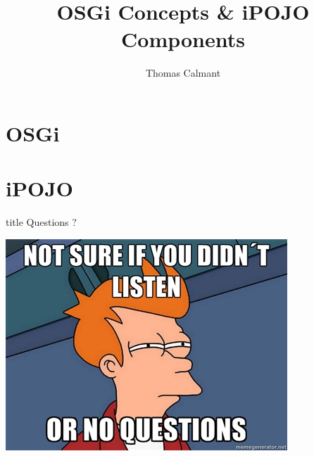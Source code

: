 \documentclass{beamer}
\title[OSGi, iPOJO]{OSGi Concepts \& iPOJO Components}
\author{Thomas Calmant}
\date{}
\begin{document}
\frame{\titlepage}

\section{OSGi}


\section{iPOJO}


\begin{frame}
  \vfill
  \centering
  \begin{beamercolorbox}[sep=8pt,center,shadow=true,rounded=true]{title}
    Questions ?\par%
  \end{beamercolorbox}
  \vspace{3ex}
  \includegraphics[width=.5\textwidth]{../imgs/questions_fry}
  \vfill
\end{frame}
\end{document}
